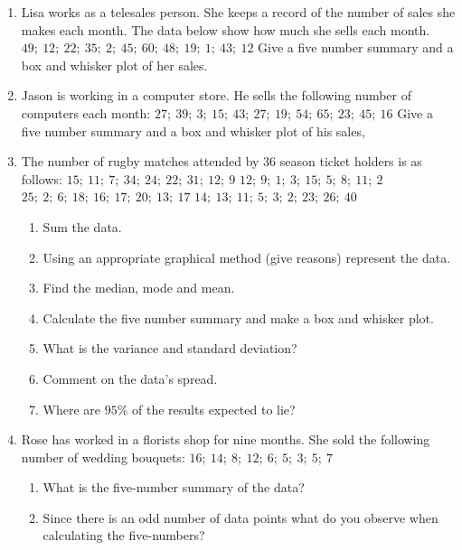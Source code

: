 {
\begin{enumerate}
\item Lisa works as a telesales person. She keeps a record of the number of sales she makes each month. The data below show how much she sells each month. \newline
\textbf{$49; ~12; ~22; ~35; ~2; ~45;~ 60; ~48; ~19; ~1;~ 43; ~12$} \newline
Give a five number summary and a box and whisker plot of her sales. 
\item Jason is working in a computer store. He sells the following number of computers each month: \newline
\textbf{$27; ~39; ~3; ~15; ~43; ~27; ~19; ~54; ~65; ~23; ~45; ~16$} \newline
Give a five number summary and a box and whisker plot of his sales,
\item The number of rugby matches attended by 36 season ticket holders is as follows: \newline
\textbf{$15; ~11;~ 7;~ 34;~ 24;~ 22;~ 31;~ 12;~ 9$} \newline
\textbf{$12;~ 9;~ 1;~ 3;~ 15;~ 5;~ 8;~ 11;~ 2$} \newline
\textbf{$25;~ 2;~ 6; ~18; ~16; ~17; ~20; ~13; ~17$} \newline
\textbf{$14;~ 13;~ 11; ~5; ~3; ~2; ~23; ~26; ~40$} \newline
	\begin{enumerate}
	\item Sum the data.
	\item Using an appropriate graphical method (give reasons) represent the data.
	\item Find the median, mode and mean.
	\item Calculate the five number summary and make a box and whisker plot.
	\item What is the variance and standard deviation?
	\item Comment on the data's spread.
	\item Where are $95\%$ of the results expected to lie?
	\end{enumerate}
\item Rose has worked in a florists shop for nine months. She sold the following number of wedding bouquets: \newline
\textbf{$16;~ 14;~ 8;~ 12;~ 6; ~5; ~3; ~5; ~7$} \newline
	\begin{enumerate}
	\item What is the five-number summary of the data?
	\item Since there is an odd number of data points what do you observe when calculating the five-numbers?
	\end{enumerate}
\end{enumerate}
}


